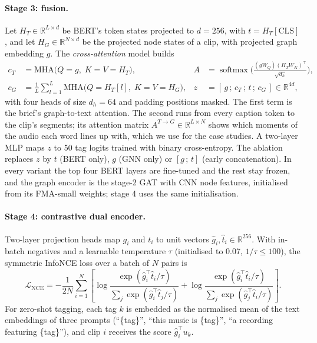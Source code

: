 \documentclass{article}
\newcommand{\R}{\mathbb{R}}
\begin{document}
\paragraph{Stage 3: fusion.}
Let $H_T \in \R^{L\times d}$ be BERT's token states projected to $d = 256$, with $t = H_T[\text{CLS}]$, and let
$H_G \in \R^{N\times d}$ be the projected node states of a clip, with projected graph embedding $g$. The
\emph{cross-attention} model builds
\begin{align}
  c_T &= \mathrm{MHA}\big(Q = g,\; K = V = H_T\big), &
  A &= \operatorname{softmax}\!\Big(\frac{(gW_Q)(H_TW_K)^\top}{\sqrt{d_h}}\Big), \\
  c_G &= \frac{1}{L}\sum_{l=1}^{L}\mathrm{MHA}\big(Q = H_T[l],\; K = V = H_G\big), &
  z &= [\,g \,;\, c_T \,;\, t \,;\, c_G\,] \in \R^{4d},
\end{align}
with four heads of size $d_h = 64$ and padding positions masked. The first term is the brief's graph-to-text attention.
The second runs from every caption token to the clip's segments; its attention matrix
$A^{T\to G} \in \R^{L\times N}$ shows which moments of the audio each word lines up with, which we use for the case
studies. A two-layer MLP maps $z$ to 50 tag logits trained with binary cross-entropy. The ablation replaces $z$ by $t$
(BERT only), $g$ (GNN only) or $[g\,;\,t]$ (early concatenation). In every variant the top four BERT layers are
fine-tuned and the rest stay frozen, and the graph encoder is the stage-2 GAT with CNN node features, initialised from
its FMA-small weights; stage 4 uses the same initialisation.

\paragraph{Stage 4: contrastive dual encoder.}
Two-layer projection heads map $g_i$ and $t_i$ to unit vectors $\hat g_i, \hat t_i \in \R^{256}$. With in-batch
negatives and a learnable temperature $\tau$ (initialised to 0.07, $1/\tau \le 100$), the symmetric InfoNCE loss
\citep{oord2018cpc, radford2021clip} over a batch of $N$ pairs is
\begin{equation}
  \mathcal{L}_{\text{NCE}} = -\frac{1}{2N}\sum_{i=1}^{N}\left[\log\frac{\exp(\hat g_i^\top \hat t_i/\tau)}
  {\sum_{j}\exp(\hat g_i^\top \hat t_j/\tau)} + \log\frac{\exp(\hat g_i^\top \hat t_i/\tau)}
  {\sum_{j}\exp(\hat g_j^\top \hat t_i/\tau)}\right].
\end{equation}
For zero-shot tagging, each tag $k$ is embedded as the normalised mean of the text embeddings of three prompts
(``\{tag\}'', ``this music is \{tag\}'', ``a recording featuring \{tag\}''), and clip $i$ receives the score
$\hat g_i^\top u_k$.
\end{document}
